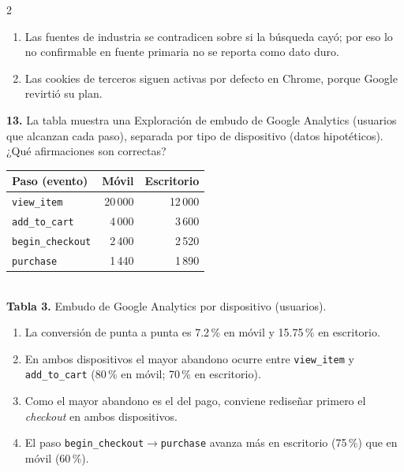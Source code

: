 \documentclass[10pt,letterpaper]{article}
\newcommand{\cas}{\framebox[1.0em]{\rule{0pt}{1.05ex}}}
\begin{document}
\begin{multicols}{2}
\begin{minipage}[t]{\columnwidth}
\begin{enumerate}[label=\cas\ \alph*),leftmargin=2.3em,itemsep=1.2pt,topsep=1pt,parsep=0pt,partopsep=0pt]
\item Las fuentes de industria se contradicen sobre si la búsqueda cayó; por eso lo no confirmable en fuente primaria no se reporta como dato duro.
\item Las cookies de terceros siguen activas por defecto en Chrome, porque Google revirtió su plan.
\end{enumerate}\end{minipage}\par\vspace{3pt}
\begin{minipage}[t]{\columnwidth}\noindent\textbf{13.} La tabla muestra una Exploración de embudo de Google Analytics (usuarios que alcanzan cada paso), separada por tipo de dispositivo (datos hipotéticos). ¿Qué afirmaciones son correctas?
\begin{center}{\scriptsize\renewcommand{\arraystretch}{1.05}\begin{tabular}{@{}lrr@{}}\toprule
Paso (evento) & Móvil & Escritorio\\\midrule
\texttt{view\_item} & 20\,000 & 12\,000\\ \texttt{add\_to\_cart} & 4\,000 & 3\,600\\ \texttt{begin\_checkout} & 2\,400 & 2\,520\\ \texttt{purchase} & 1\,440 & 1\,890\\\bottomrule\end{tabular}}\\[1pt]{\tiny\textbf{Tabla 3.} Embudo de Google Analytics por dispositivo (usuarios).}\end{center}
\vspace{1pt}\begin{enumerate}[label=\cas\ \alph*),leftmargin=2.3em,itemsep=1.2pt,topsep=1pt,parsep=0pt,partopsep=0pt]
\item La conversión de punta a punta es 7.2\,\% en móvil y 15.75\,\% en escritorio.
\item En ambos dispositivos el mayor abandono ocurre entre \texttt{view\_item} y \texttt{add\_to\_cart} (80\,\% en móvil; 70\,\% en escritorio).
\item Como el mayor abandono es el del pago, conviene rediseñar primero el \textit{checkout} en ambos dispositivos.
\item El paso \texttt{begin\_checkout}$\to$\texttt{purchase} avanza más en escritorio (75\,\%) que en móvil (60\,\%).
\end{enumerate}\end{minipage}\par\vspace{3pt}

\end{multicols}
\end{document}

